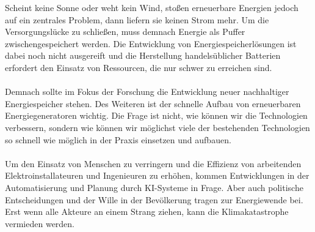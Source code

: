  Scheint keine Sonne oder weht kein Wind, stoßen erneuerbare Energien jedoch auf ein zentrales Problem, dann liefern sie keinen Strom mehr. Um die Versorgungslücke zu schließen, muss demnach Energie als Puffer zwischengespeichert werden. Die Entwicklung von Energiespeicherlösungen ist dabei noch nicht ausgereift und die Herstellung handelsüblicher Batterien erfordert den Einsatz von Ressourcen, die nur schwer zu erreichen sind.\\\\
  Demnach sollte im Fokus der Forschung die Entwicklung neuer nachhaltiger Energiespeicher stehen. Des Weiteren ist der schnelle Aufbau von erneuerbaren Energiegeneratoren wichtig. Die Frage ist nicht, wie können wir die Technologien verbessern, sondern wie können wir möglichst viele  der bestehenden Technologien so schnell wie möglich in der Praxis einsetzen und aufbauen.\\\\
  Um den Einsatz von Menschen zu verringern und die Effizienz von arbeitenden Elektroinstallateuren und Ingenieuren zu erhöhen, kommen Entwicklungen in der Automatisierung und Planung durch KI-Systeme in Frage. Aber auch politische Entscheidungen und der Wille in der Bevölkerung tragen zur Energiewende bei. Erst wenn alle Akteure an einem Strang ziehen, kann die Klimakatastrophe vermieden werden.
